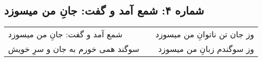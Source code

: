 \begin{center}
\section*{شماره ۴: شمع آمد و گفت: جانِ من میسوزد}
\label{sec:004}
\begin{longtable}{l p{0.5cm} r}
شمع آمد و گفت: جانِ من میسوزد
&&
وز جان تن ناتوانِ من میسوزد
\\
سوگند همی خورم به جان و سرِ خویش
&&
وز سوگندم زبانِ من میسوزد
\\
\end{longtable}
\end{center}
